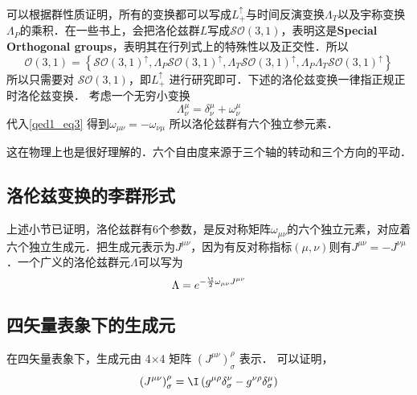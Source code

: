 可以根据群性质证明，所有的变换都可以写成$L_{+}^{\uparrow}$与时间反演变换$ \Lambda_{T}$以及宇称变换$\Lambda_{P}$的乘积．在一些书上，会把洛伦兹群$L$写成$\mathcal{S O}(3,1)$，表明这是\textbf{Special Orthogonal groups}，表明其在行列式上的特殊性以及正交性．所以$$\mathcal{O}(3,1)=\left\{\mathcal{S O}(3,1)^{\uparrow}, \Lambda_{P} \mathcal{S O}(3,1)^{\uparrow}, \Lambda_{T} \mathcal{S O}(3,1)^{\uparrow}, \Lambda_{P} \Lambda_{T} \mathcal{S O}(3,1)^{\uparrow}\right\}$$所以只需要对 $\mathcal{S O}(3,1)$，即$L_{+}^{\uparrow}$ 进行研究即可．下述的洛伦兹变换一律指正规正时洛伦兹变换．
考虑一个无穷小变换
\begin{equation}\Lambda_{\nu}^{\mu}=\delta_{\nu}^{\mu}+\omega_{\nu}^{\mu}\end{equation}
代入\autoref{qed1_eq3} 得到$\omega_{\mu \nu}=-\omega_{\nu \mu}$
所以洛伦兹群有六个独立参元素．

这在物理上也是很好理解的．六个自由度来源于三个轴的转动和三个方向的平动．
\subsection{洛伦兹变换的李群形式}
上述小节已证明，洛伦兹群有6个参数，是反对称矩阵$\omega_{\mu\nu}$的六个独立元素，对应着六个独立生成元．把生成元表示为$J^{\mu\nu}$，因为有反对称指标$(\mu,\nu)$则有$J^{\mu\nu}=-J^{\nu\mu}$．一个广义的洛伦兹群元$\Lambda$可以写为
\begin{equation}
\Lambda=e^{-\frac{\I}{2} \omega_{\mu\nu}J^{\mu\nu}}
\end{equation}
\subsection{四矢量表象下的生成元}
在四矢量表象下，生成元由 4×4 矩阵 $(J^{\mu\nu})_\sigma^\rho$ 表示．
可以证明，
\begin{equation}\left(J^{\mu \nu}\right)_{\sigma}^{\rho}=\I\left(g^{\mu \rho} \delta_{\sigma}^{\nu}-g^{\nu \rho} \delta_{\sigma}^{\mu}\right)\end{equation}
